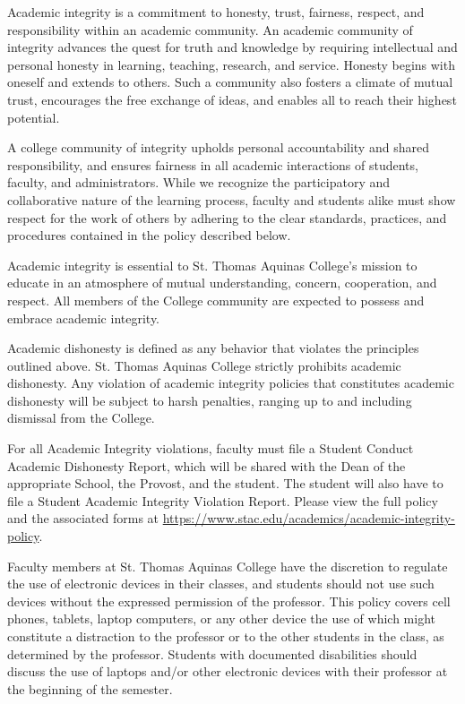 \documentclass[11pt,letterpaper]{article}
\begin{document}
Academic integrity is a commitment to honesty, trust, fairness, respect, and responsibility within an academic community. An academic community of integrity advances the quest for truth and knowledge by requiring intellectual and personal honesty in learning, teaching, research, and service. Honesty begins with oneself and extends to others. Such a community also fosters a climate of mutual trust, encourages the free exchange of ideas, and enables all to reach their highest potential. \pspace

A college community of integrity upholds personal accountability and shared responsibility, and ensures fairness in all academic interactions of students, faculty, and administrators. While we recognize the participatory and collaborative nature of the learning process, faculty and students alike must show respect for the work of others by adhering to the clear standards, practices, and procedures contained in the policy described below. \pspace

Academic integrity is essential to St. Thomas Aquinas College's mission to educate in an atmosphere of mutual understanding, concern, cooperation, and respect. All members of the College community are expected to possess and embrace academic integrity. \sectionbreak




Academic dishonesty is defined as any behavior that violates the principles outlined above. St. Thomas Aquinas College strictly prohibits academic dishonesty. Any violation of academic integrity policies that constitutes academic dishonesty will be subject to harsh penalties, ranging up to and including dismissal from the College. \pspace

For all Academic Integrity violations, faculty must file a Student Conduct Academic Dishonesty Report, which will be shared with the Dean of the appropriate School, the Provost, and the student. The student will also have to file a Student Academic Integrity Violation Report. Please view the full policy and the associated forms at \url{https://www.stac.edu/academics/academic-integrity-policy}. \sectionbreak




Faculty members at St. Thomas Aquinas College have the discretion to regulate the use of electronic devices in their classes, and students should not use such devices without the expressed permission of the professor. This policy covers cell phones, tablets, laptop computers, or any other device the use of which might constitute a distraction to the professor or to the other students in the class, as determined by the professor. Students with documented disabilities should discuss the use of laptops and/or other electronic devices with their professor at the beginning of the semester. \pspace
\end{document}
